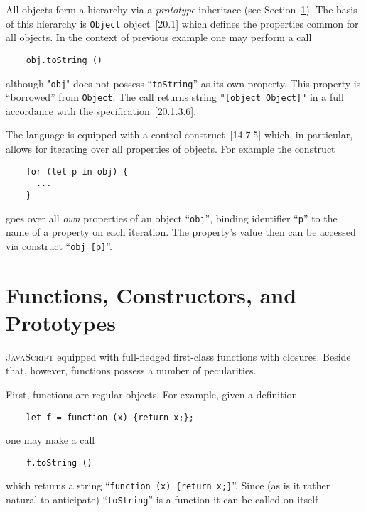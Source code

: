 \documentclass{article}
\newcommand{\js}{\textsc{JavaScript}\xspace}
\newcommand{\rf}[1]{[\textsc{#1}]}
\begin{document}
All objects form a hierarchy via a \emph{prototype} inheritace (see Section~\ref{sec:prototype}). The basis of
this hierarchy is \lstinline|Object| object~\rf{20.1} which defines the properties common for all objects.
In the context of previous example one may perform a call

\begin{lstlisting}
    obj.toString ()
\end{lstlisting}

although "\lstinline|obj|" does not possess ``\lstinline|toString|'' as its own property. This property is ``borrowed''
from \lstinline|Object|. The call returns string \lstinline|"[object Object]"| in a full accordance with the
specification~\rf{20.1.3.6}.

The language is equipped with a control construct~\rf{14.7.5} which, in particular, allows for iterating over
all properties of objects. For example the construct

\begin{lstlisting}
    for (let p in obj) {
      ...
    }
\end{lstlisting}

goes over all \emph{own} properties of an object ``\lstinline|obj|'', binding identifier ``\lstinline|p|'' to the
name of a property on each iteration. The property's value then can be accessed via construct ``\lstinline|obj [p]|''.

\section{Functions, Constructors, and Prototypes}
\label{sec:prototype}

\js equipped with full-fledged first-class functions with closures. Beside that, however, functions possess a number of pecularities.

First, functions are regular objects. For example, given a definition

\begin{lstlisting}
    let f = function (x) {return x;};
\end{lstlisting}

one may make a call

\begin{lstlisting}
    f.toString ()
\end{lstlisting}

which returns a string ``\lstinline|function (x) {return x;}|''. Since (as is it rather natural to anticipate) ``\lstinline|toString|''
is a function it can be called on itself
\end{document}
